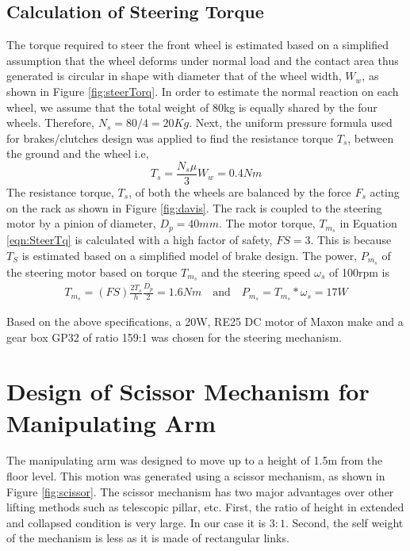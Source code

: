 \subsection{Calculation of Steering Torque}
The torque required to steer the front wheel is estimated based on a simplified assumption that the wheel deforms under normal load and the contact area thus generated is  circular in shape with diameter that of the wheel width, $W_w$, as shown in Figure \ref{fig:steerTorq}. 
In order to estimate the normal reaction on each wheel, we assume that the total weight of 80kg is equally shared by the four wheels. 
Therefore, $N_s=80/4=20Kg$. Next, the uniform pressure formula used for  brakes/clutches design was applied to find the resistance  torque $T_s$, between the ground and the wheel i.e, 
\begin{equation}
\label{eqn:brake}
T_s=\frac{N_s\mu}{3}W_w= 0.4Nm
\end{equation}  
The resistance torque, $T_s$, of  both the wheels  are balanced by the force $F_s$ acting on the rack as shown in Figure \ref{fig:davis}. The rack is coupled to the steering motor by a pinion of diameter, $D_p=40mm$. The motor  torque, $T_{m_s}$  in Equation  \ref{eqn:SteerTq} is calculated with a  high factor of safety, $FS=3$. This is because $T_S$ is estimated  based on a simplified model of brake design. The power, $P_{m_s}$ of the steering motor based on  torque $T_{m_s}$ and the steering speed $\omega_s$ of 100rpm is 
\begin{equation}
\begin{aligned}
\label{eqn:SteerTq}
T_{m_s}=(FS)\frac{2T_s}{h}\frac{D_p}{2}=1.6Nm \quad \text{and}\quad P_{m_s}=T_{m_s}*\omega_s=17W
\end{aligned}
\end{equation} 

Based on the above specifications, a 20W, RE25 DC motor of Maxon  make and a gear box  GP32 of ratio 159:1 was chosen for the steering mechanism. 
 
\section{Design of Scissor Mechanism for Manipulating Arm}
 The manipulating arm  was designed to move  up to a height of 1.5m from the floor level. This motion was generated using  a scissor mechanism, as shown in Figure \ref{fig:scissor}. The scissor mechanism has two major advantages over other lifting methods such as telescopic pillar, etc.  First, the  ratio of height in extended and collapsed condition is very large. In our case it is $3:1$. Second, the self weight of the mechanism is less as it is made of rectangular links.

